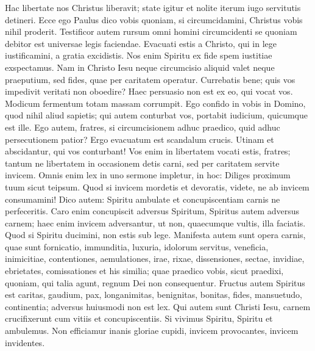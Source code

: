 \begin{biblechapter} 
\verse Hac libertate nos Christus liberavit; state igitur et nolite iterum iugo servitutis detineri.  
\verse Ecce ego Paulus dico vobis quoniam, si circumcidamini, Christus vobis nihil proderit. 
\verse Testificor autem rursum omni homini circumcidenti se quoniam debitor est universae legis faciendae. 
\verse Evacuati estis a Christo, qui in lege iustificamini, a gratia excidistis. 
\verse Nos enim Spiritu ex fide spem iustitiae exspectamus. 
\verse Nam in Christo Iesu neque circumcisio aliquid valet neque praeputium, sed fides, quae per caritatem operatur. 
\verse Currebatis bene; quis vos impedivit veritati non oboedire? 
\verse Haec persuasio non est ex eo, qui vocat vos. 
\verse Modicum fermentum totam massam corrumpit. 
\verse Ego confido in vobis in Domino, quod nihil aliud sapietis; qui autem conturbat vos, portabit iudicium, quicumque est ille. 
\verse Ego autem, fratres, si circumcisionem adhuc praedico, quid adhuc persecutionem patior? Ergo evacuatum est scandalum crucis. 
\verse Utinam et abscidantur, qui vos conturbant! 
\verse Vos enim in libertatem vocati estis, fratres; tantum ne libertatem in occasionem detis carni, sed per caritatem servite invicem. 
\verse Omnis enim lex in uno sermone impletur, in hoc: Diliges proximum tuum sicut teipsum. 
\verse Quod si invicem mordetis et devoratis, videte, ne ab invicem consumamini! 
\verse Dico autem: Spiritu ambulate et concupiscentiam carnis ne perfeceritis.  
\verse Caro enim concupiscit adversus Spiritum, Spiritus autem adversus carnem; haec enim invicem adversantur, ut non, quaecumque vultis, illa faciatis. 
\verse Quod si Spiritu ducimini, non estis sub lege. 
\verse Manifesta autem sunt opera carnis, quae sunt fornicatio, immunditia, luxuria, 
\verse idolorum servitus, veneficia, inimicitiae, contentiones, aemulationes, irae, rixae, dissensiones, sectae, 
\verse invidiae, ebrietates, comissationes et his similia; quae praedico vobis, sicut praedixi, quoniam, qui talia agunt, regnum Dei non consequentur.  
\verse Fructus autem Spiritus est caritas, gaudium, pax, longanimitas, benignitas, bonitas, fides, 
\verse mansuetudo, continentia; adversus huiusmodi non est lex.  
\verse Qui autem sunt Christi Iesu, carnem crucifixerunt cum vitiis et concupiscentiis. 
\verse Si vivimus Spiritu, Spiritu et ambulemus. 
\verse Non efficiamur inanis gloriae cupidi, invicem provocantes, invicem invidentes. 
\end{biblechapter}


